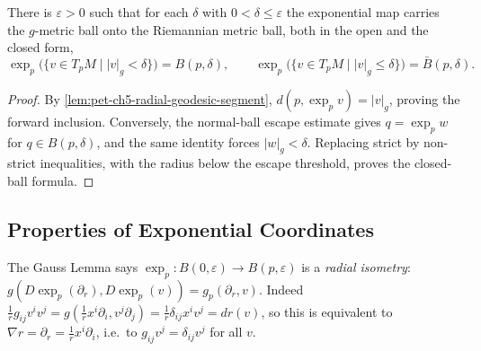\begin{corollary}
  \label{cor:pet-ch5-metric-ball-image}
  \leanok
  There is $\varepsilon>0$ such that for each $\delta$ with $0<\delta\le\varepsilon$
  the exponential map carries the $g$-metric ball onto the Riemannian metric ball,
  both in the open and the closed form,
  \[
    \exp_p\bigl(\{v\in T_pM\mid |v|_g<\delta\}\bigr)=B(p,\delta),\qquad
    \exp_p\bigl(\{v\in T_pM\mid |v|_g\le\delta\}\bigr)=\bar B(p,\delta).
  \]
\end{corollary}
\begin{proof}
  \leanok
  \sketch
  By \cref{lem:pet-ch5-radial-geodesic-segment},
  $d(p,\exp_pv)=|v|_g$, proving the forward inclusion.  Conversely, the normal-ball
  escape estimate gives $q=\exp_pw$ for $q\in B(p,\delta)$, and the same identity
  forces $|w|_g<\delta$.  Replacing strict by non-strict inequalities, with the
  radius below the escape threshold, proves the closed-ball formula.
\end{proof}

\subsection{Properties of Exponential Coordinates}

\begin{remark}
  \label{rem:pet-ch5-radial-isometry}
  \leanok
  The Gauss Lemma says $\exp_p:B(0,\varepsilon)\to B(p,\varepsilon)$ is a
  \emph{radial isometry}: $g(D\exp_p(\partial_r),D\exp_p(v))=g_p(\partial_r,v)$.
  Indeed $\tfrac1rg_{ij}v^iv^j=g(\tfrac1rx^i\partial_i,v^j\partial_j)=
  \tfrac1r\delta_{ij}x^iv^j=dr(v)$, so this is equivalent to $\nabla r=\partial_r=
  \tfrac1rx^i\partial_i$, i.e.\ to $g_{ij}v^j=\delta_{ij}v^j$ for all $v$.
\end{remark}

